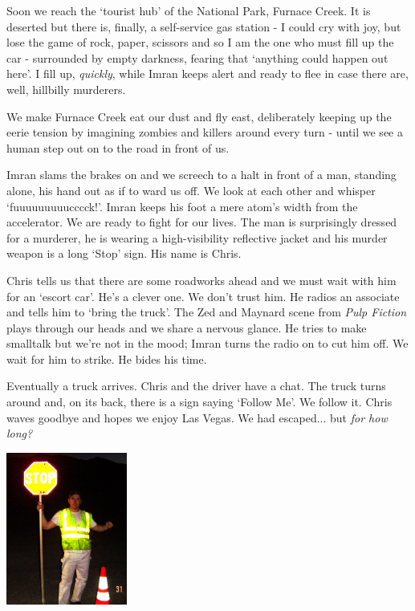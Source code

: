 \documentclass[a5paper,titlepage,11pt,draft]{book}
\begin{document}
Soon we reach the `tourist hub' of the National Park, Furnace Creek.  It is deserted but there is, finally, a self-service gas station - I could cry with joy, but lose the game of rock, paper, scissors and so I am the one who must fill up the car - surrounded by empty darkness, fearing that `anything could happen out here'.  I fill up, \emph{quickly}, while Imran keeps alert and ready to flee in case there are, well, hillbilly murderers.

We make Furnace Creek eat our dust and fly east, deliberately keeping up the eerie tension by imagining zombies and killers around every turn - until we see a human step out on to the road in front of us.

Imran slams the brakes on and we screech to a halt in front of a man, standing alone, his hand out as if to ward us off.  We look at each other and whisper `fuuuuuuuuucccck!'.  Imran keeps his foot a mere atom's width from the accelerator.  We are ready to fight for our lives.  The man is surprisingly dressed for a murderer, he is wearing a high-visibility reflective jacket and his murder weapon is a long `Stop' sign.  His name is Chris.

Chris tells us that there are some roadworks ahead and we must wait with him for an `escort car'.  He's a clever one.  We don't trust him.  He radios an associate and tells him to `bring the truck'.  The Zed and Maynard scene from \emph{Pulp Fiction} plays through our heads and we share a nervous glance.  He tries to make smalltalk but we're not in the mood; Imran turns the radio on to cut him off.  We wait for him to strike.  He bides his time.

Eventually a truck arrives.  Chris and the driver have a chat.  The truck turns around and, on its back, there is a sign saying `Follow Me'.  We follow it.  Chris waves goodbye and hopes we enjoy Las Vegas.  We had escaped... but \emph{for how long?}

\begin{center}\includegraphics[height=50mm]{gfx/DSC00683}\end{center}
\end{document}
